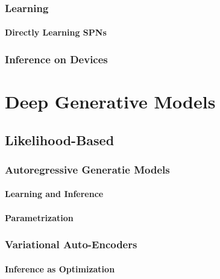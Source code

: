 		\subsection{Learning} %

			\subsubsection{Directly Learning SPNs} %

		\subsection{Inference on Devices} %

\chapter{Deep Generative Models} %

	\section{Likelihood-Based} %

		\subsection{Autoregressive Generatie Models} %

			\subsubsection{Learning and Inference} %

			\subsubsection{Parametrization} %

		\subsection{Variational Auto-Encoders} %

			\subsubsection{Inference as Optimization} %

